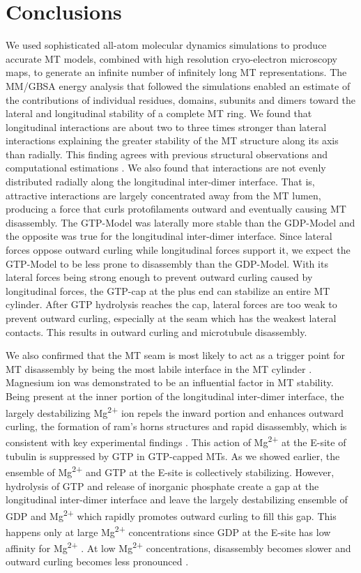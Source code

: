 \documentclass[11pt]{report}
\begin{document}
\section{Conclusions}

We used sophisticated all-atom molecular dynamics simulations to produce accurate MT models, combined
with high resolution cryo-electron
microscopy maps, to generate an infinite
number of infinitely long MT representations. The MM/GBSA energy analysis that
followed the simulations enabled an
estimate of the contributions of 
individual residues, domains, subunits and dimers
toward the lateral and longitudinal stability 
of a complete MT ring.
We found that longitudinal interactions
are about two to three times stronger 
than lateral interactions explaining the greater stability of the MT structure along its axis than radially. This finding agrees with previous structural observations \cite{Nogales1999}
and computational estimations \cite{VanBuren2002,Kononova2014}.
We also found that 
interactions are not evenly
distributed radially along the longitudinal inter-dimer
interface. That is, attractive interactions
are largely concentrated away from the
MT lumen, producing a force that
curls protofilaments outward and eventually causing MT
disassembly.
The GTP-Model was laterally more stable than
the GDP-Model and the opposite was true for the longitudinal inter-dimer interface. 
Since lateral forces oppose outward
curling while longitudinal forces
support it, we expect the GTP-Model to 
be less prone to disassembly than the GDP-Model. With its lateral forces being
strong enough to prevent outward
curling caused by longitudinal forces,
the GTP-cap at the plus end can stabilize an entire 
MT cylinder.
After GTP hydrolysis reaches the cap,
lateral forces are too weak to 
prevent outward curling, especially at
the seam which has the weakest lateral
contacts. This results in outward curling
and microtubule disassembly.

We also confirmed that the MT seam 
is most likely to act as a trigger point for MT
disassembly by being the most labile
interface in the MT cylinder
\cite{Katsuki2014}.
Magnesium ion was demonstrated to be an influential
factor in MT stability. Being present at the
inner portion of the longitudinal inter-dimer interface, the largely destabilizing 
Mg\textsuperscript{2+} ion repels the inward 
portion and enhances outward curling,
the formation of ram's horns structures
and rapid disassembly, which is consistent with
key experimental findings \cite{Mandelkow1991}. This action
of Mg\textsuperscript{2+} at the E-site of tubulin
is suppressed by GTP in GTP-capped
MTs. As we showed earlier, the ensemble of
Mg\textsuperscript{2+} and GTP at the E-site
is collectively stabilizing. However,
hydrolysis of GTP and release of 
inorganic phosphate 
create a gap at the longitudinal inter-dimer
interface and leave the
largely destabilizing ensemble of
GDP and Mg\textsuperscript{2+} which
rapidly promotes outward curling
to fill this gap.
This happens only at large Mg\textsuperscript{2+}
concentrations since GDP at the
E-site has low affinity for Mg\textsuperscript{2+}
\cite{Correia1987}.
At low Mg\textsuperscript{2+} concentrations,
disassembly becomes slower and 
outward curling becomes less pronounced
\cite{Mandelkow1991}.
\end{document}

